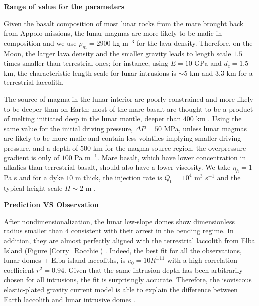 \vspace{.5cm} \textbf{Range of value for the parameters} \vspace{.5cm}

Given the basalt composition of most lunar rocks from the mare brought
back from  Appolo missions,  the lunar  magmas are  more likely  to be
mafic in  composition and we use  $\rho_m = 2900$ kg  m$^{-3}$ for the
lava density. Therefore, on the Moon,  the larger lava density and the
smaller  gravity  leads  to  length scale  $1.5$  times  smaller  than
terrestrial ones; for  instance, using $E=10$ GPa and $d_c  = 1.5$ km,
the characteristic  length scale for  lunar intrusions is $\sim  5$ km
and $3.3$ km for a terrestrial laccolith.

The source of  magma in the lunar interior are  poorly constrained and
more likely to  be deeper than on  Earth; most of the  mare basalt are
thought to be a product of melting initiated deep in the lunar mantle,
deeper than $400$ km \citep{Shearer:2006gg}.  Using the same value for
the initial driving pressure, $\Delta P = 50$ MPa, unless lunar magmas
are  likely to  be  more  mafic and  contain  less volatiles  implying
smaller driving pressure, and a depth of $500$ km for the magma source
region, the overpressure  gradient is only of $100$  Pa m$^{-1}$. Mare
basalt, which  have lower  concentration in alkalies  than terrestrial
basalt, should also  have a lower viscosity.  We take  $\eta_h=1$ Pa s
and  for a  dyke  $10$ m  thick, the  injection  rate is  $Q_0=10^{4}$
m$^{3}$ s$^{-1}$ and the typical height scale $H\sim 2$ m .

\vspace{.5cm} \textbf{Prediction VS Observation} \vspace{.5cm}

After   nondimensionalization,   the   lunar  low-slope   domes   show
dimensionless radius smaller than $4$  consistent with their arrest in
the bending  regime. In  addition, they  are almost  perfectly aligned
with   the   terrestrial   laccolith    from   Elba   Island   (Figure
\ref{Corry_Rocchie}) \citep{Michaut:2011kg}. Indeed,  the best fit for
all  the  observations,  lunar  domes +  Elba  island  laccoliths,  is
$h_0   =    10R^{1.11}$   with   a   high    correlation   coefficient
$r^2=0.94$. Given that  the same intrusion depth  has been arbitrarily
chosen  for   all  intrusions,  the  fit   is  surprisingly  accurate.
Therefore, the isoviscous elastic-plated gravity current model is able
to explain the difference between  Earth laccolith and lunar intrusive
domes \citep{Michaut:2011kg}.

